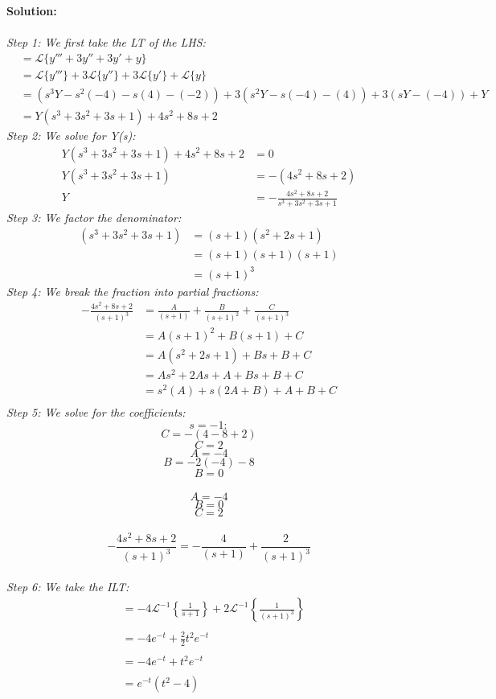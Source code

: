 \documentclass{article}
\begin{document}
    \textbf{Solution:} \\ \\
    \textit{Step 1: We first take the LT of the LHS:} 
    \begin{align*}
        &= \mathcal{L}\{y''' + 3y''+ 3y' + y\} \\
        &= \mathcal{L}\{y'''\} + 3\mathcal{L}\{y''\} + 3\mathcal{L} \{y'\} + \mathcal{L} \{y\} \\
        &= (s^{3}Y -s^{2}(-4) -s(4) -(-2)) + 3(s^{2}Y -s(-4) - (4)) + 3(sY - (-4)) + Y \\
        &= Y(s^{3} + 3s^{2} + 3s + 1) + 4s^{2} + 8s + 2
    \end{align*}
    \textit{Step 2: We solve for Y(s):} \\
    \begin{align*}
        Y(s^{3}  + 3s^{2} + 3s + 1) + 4s^{2} + 8s + 2 &= 0 \\
        Y(s^{3} + 3s^{2} + 3s + 1) &= -(4s^{2} + 8s + 2) \\
        Y &= -\frac{4s^{2} + 8s + 2}{s^{3}  + 3s^{2} + 3s + 1}
    \end{align*}
    \textit{Step 3: We factor the denominator:}
    \begin{align*}
        (s^{3}  + 3s^{2} + 3s + 1) &= (s + 1)(s^{2} + 2s + 1) \\
        &= (s + 1)(s + 1)(s + 1) \\
        &= (s + 1)^{3}
    \end{align*}
    \textit{Step 4: We break the fraction into partial fractions:}
    \begin{align*}
        -\frac{4s^{2} + 8s + 2}{(s + 1)^{3}} &= \frac{A}{(s + 1)} + \frac{B}{(s + 1)^{2}} + \frac{C}{(s + 1)^{3}} \\
        &= A(s + 1)^{2} + B(s + 1) + C \\
        &= A(s^{2} + 2s + 1) + Bs + B + C \\
        &= As^{2} + 2As + A + Bs + B + C \\
        &= s^{2}(A) + s(2A + B) + A + B + C \\ 
    \end{align*}
    \textit{Step 5: We solve for the coefficients:}
    $$s = -1:$$
    $$C = -(4 - 8 + 2)$$
    $$C = 2$$
    $$A = -4$$
    $$B = -2(-4) - 8$$
    $$B = 0$$
     \\
    $$A = -4$$ 
    $$B = 0$$ 
    $$C = 2$$ \\ 
    $$-\frac{4s^{2} + 8s + 2}{(s + 1)^{3}}= -\frac{4}{(s + 1)} + \frac{2}{(s + 1)^{3}}$$ \\
    \textit{Step 6: We take the ILT:}
    \begin{align*}
        &= -4\mathcal{L}^{-1}\left\{\frac{1}{s + 1}\right\} + 2\mathcal{L}^{-1} \left\{\frac{1}{(s + 1)^{3}}\right\} \\ \\
        &= -4e^{-t} + \frac{2}{2}t^{2}e^{-t} \\ \\
        &= -4e^{-t} + t^{2}e^{-t} \\ \\
        &= e^{-t}(t^{2} - 4)
    \end{align*}
\end{document}
